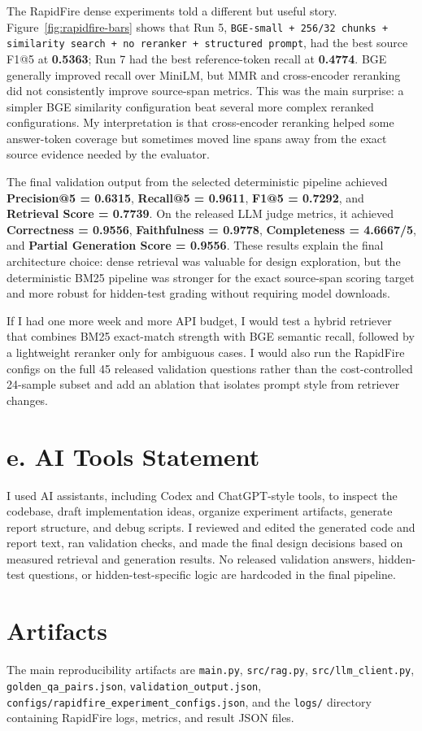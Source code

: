 \documentclass[11pt,twocolumn]{article}
\newcommand{\code}[1]{\texttt{\footnotesize #1}}
\newcommand{\metric}[1]{\textbf{#1}}
\begin{document}
The RapidFire dense experiments told a different but useful story. Figure~\ref{fig:rapidfire-bars} shows that Run 5, \code{BGE-small + 256/32 chunks + similarity search + no reranker + structured prompt}, had the best source F1@5 at \metric{0.5363}; Run 7 had the best reference-token recall at \metric{0.4774}. BGE generally improved recall over MiniLM, but MMR and cross-encoder reranking did not consistently improve source-span metrics. This was the main surprise: a simpler BGE similarity configuration beat several more complex reranked configurations. My interpretation is that cross-encoder reranking helped some answer-token coverage but sometimes moved line spans away from the exact source evidence needed by the evaluator.

The final validation output from the selected deterministic pipeline achieved \metric{Precision@5 = 0.6315}, \metric{Recall@5 = 0.9611}, \metric{F1@5 = 0.7292}, and \metric{Retrieval Score = 0.7739}. On the released LLM judge metrics, it achieved \metric{Correctness = 0.9556}, \metric{Faithfulness = 0.9778}, \metric{Completeness = 4.6667/5}, and \metric{Partial Generation Score = 0.9556}. These results explain the final architecture choice: dense retrieval was valuable for design exploration, but the deterministic BM25 pipeline was stronger for the exact source-span scoring target and more robust for hidden-test grading without requiring model downloads.

If I had one more week and more API budget, I would test a hybrid retriever that combines BM25 exact-match strength with BGE semantic recall, followed by a lightweight reranker only for ambiguous cases. I would also run the RapidFire configs on the full 45 released validation questions rather than the cost-controlled 24-sample subset and add an ablation that isolates prompt style from retriever changes.

\section{e. AI Tools Statement}

I used AI assistants, including Codex and ChatGPT-style tools, to inspect the codebase, draft implementation ideas, organize experiment artifacts, generate report structure, and debug scripts. I reviewed and edited the generated code and report text, ran validation checks, and made the final design decisions based on measured retrieval and generation results. No released validation answers, hidden-test questions, or hidden-test-specific logic are hardcoded in the final pipeline.

\section*{Artifacts}

The main reproducibility artifacts are \code{main.py}, \code{src/rag.py}, \code{src/llm\_client.py}, \code{golden\_qa\_pairs.json}, \code{validation\_output.json}, \code{configs/rapidfire\_experiment\_configs.json}, and the \code{logs/} directory containing RapidFire logs, metrics, and result JSON files.
\end{document}
